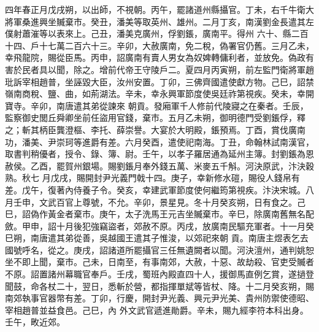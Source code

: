\begin{pinyinscope}
 四年春正月戊戌朔，以出師，不視朝。丙午，罷諸道州縣攝官。丁未，右千牛衛大將軍桑進興坐贓棄市。癸丑，潘美等取英州、雄州。二月丁亥，南漢劉金長遣其左僕射蕭漼等以表來上。己丑，潘美克廣州，俘劉鋹，廣南平。得州
 六十、縣二百十四、戶十七萬二百六十三。辛卯，大赦廣南，免二稅，偽署官仍舊。三月乙未，幸飛龍院，賜從臣馬。丙申，詔廣南有賣人男女為奴婢轉傭利者，並放免。偽政有害於民者具以聞，除之。增前代帝王守陵戶二。夏四月丙寅朔，前左監門衛將軍趙玭訴宰相趙普，坐誣毀大臣，汝州安置。丁卯，三佛齊國遣使獻方物。己巳，詔禁嶺南商稅、鹽、曲，如荊湖法。辛未，幸永興軍節度使吳廷祚第視疾。癸未，幸開寶寺。辛卯，南唐遣其弟從諫來
 朝貢。發廂軍千人修前代陵寢之在秦者。壬辰，監察御史閭丘舜卿坐前任盜用官錢，棄市。五月乙未朔，御明德門受劉鋹俘，釋之；斬其柄臣龔澄樞、李托、薛崇譽。大宴於大明殿，鋹預焉。丁酉，賞伐廣南功，潘美、尹崇珂等進爵有差。六月癸酉，遣使祀南海。丁丑，命翰林試南漢官，取書判稍優者，授令、錄、簿、尉。壬午，以孝子羅居通為延州主簿。封劉鋹為恩赦侯。乙酉，罷賀州銀場。賜劉鋹月奉外錢五萬、米麥五千斛。河決原武，汴決穀熟。秋七
 月戊戌，賜開封尹光義門戟十四。庚子，幸新修水磑，賜役人錢帛有差。戊午，復著內侍養子令。癸亥，幸建武軍節度使何繼筠第視疾。汴決宋城。八月壬申，文武百官上尊號，不允。辛卯，景星見。冬十月癸亥朔，日有食之。己巳，詔偽作黃金者棄市。庚午，太子洗馬王元吉坐贓棄市。辛巳，除廣南舊無名配斂。甲申，詔十月後犯強竊盜者，郊赦不原。丙戌，放廣南民驅充軍者。十一月癸巳朔，南唐遣其弟從善，吳越國王遣其子惟浚，以郊祀來朝
 貢。南唐主煜表乞去國號呼名，從之。庚戌，詔諸道所罷攝官三任無遺闕者以聞。河決澶州，通判姚恕坐不即上聞，棄市。己未，日南至，有事南郊，大赦，十惡、故劫殺、官吏受贓者不原。詔置諸州幕職官奉戶。壬戌，蜀班內殿直四十人，援御馬直例乞賞，遂撾登聞鼓，命各杖二十，翌日，悉斬於營，都指揮單斌等皆杖、降。十二月癸亥朔，賜南郊執事官器幣有差。丁卯，行慶，開封尹光義、興元尹光美、貴州防禦使德昭、宰相趙普並益食邑。己巳，內
 外文武官遞進勛爵。辛未，賜九經李符本科出身。壬午，畋近郊。



\end{pinyinscope}